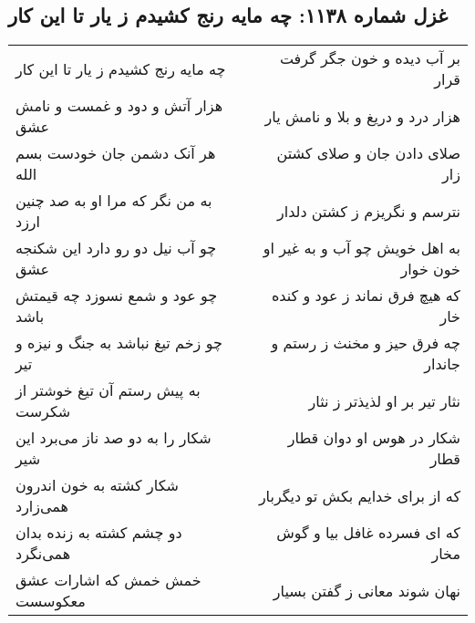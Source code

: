 \begin{center}
\section*{غزل شماره ۱۱۳۸: چه مایه رنج کشیدم ز یار تا این کار}
\label{sec:1138}
\begin{longtable}{l p{0.5cm} r}
چه مایه رنج کشیدم ز یار تا این کار
&&
بر آب دیده و خون جگر گرفت قرار
\\
هزار آتش و دود و غمست و نامش عشق
&&
هزار درد و دریغ و بلا و نامش یار
\\
هر آنک دشمن جان خودست بسم الله
&&
صلای دادن جان و صلای کشتن زار
\\
به من نگر که مرا او به صد چنین ارزد
&&
نترسم و نگریزم ز کشتن دلدار
\\
چو آب نیل دو رو دارد این شکنجه عشق
&&
به اهل خویش چو آب و به غیر او خون خوار
\\
چو عود و شمع نسوزد چه قیمتش باشد
&&
که هیچ فرق نماند ز عود و کنده خار
\\
چو زخم تیغ نباشد به جنگ و نیزه و تیر
&&
چه فرق حیز و مخنث ز رستم و جاندار
\\
به پیش رستم آن تیغ خوشتر از شکرست
&&
نثار تیر بر او لذیذتر ز نثار
\\
شکار را به دو صد ناز می‌برد این شیر
&&
شکار در هوس او دوان قطار قطار
\\
شکار کشته به خون اندرون همی‌زارد
&&
که از برای خدایم بکش تو دیگربار
\\
دو چشم کشته به زنده بدان همی‌نگرد
&&
که ای فسرده غافل بیا و گوش مخار
\\
خمش خمش که اشارات عشق معکوسست
&&
نهان شوند معانی ز گفتن بسیار
\\
\end{longtable}
\end{center}
